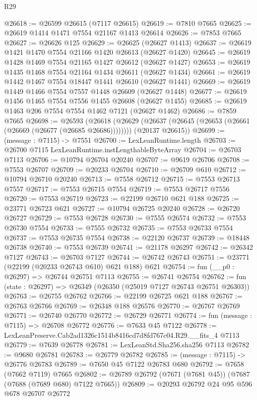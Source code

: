 \begin{lexlean}{R29}
\begin{coremodule}
@26618 := @26599 @26615 (@7117 @26615)
@26619 := @7810 @7665
@26625 := @26619 @1414 @1471 @7554 @21167 @1413 @26614
@26626 := @7853 @7665
@26627 := @26626 @125
@26629 := @26625 (@26627 @1413)
@26637 := @26619 @1421 @1470 @7554 @21166 @1420 @26613 (@26627 @1420)
@26645 := @26619 @1428 @1469 @7554 @21165 @1427 @26612 (@26627 @1427)
@26653 := @26619 @1435 @1468 @7554 @21164 @1434 @26611 (@26627 @1434)
@26661 := @26619 @1442 @1467 @7554 @18447 @1441 @26610 (@26627 @1441)
@26669 := @26619 @1449 @1466 @7554 @7557 @1448 @26609 (@26627 @1448)
@26677 := @26619 @1456 @1465 @7554 @7556 @1455 @26608 (@26627 @1455)
@26685 := @26619 @1463 @206 @7554 @7554 @1462 @7121 (@26627 @1462)
@26686 := @7859 @7665
@26698 := @26593
    (@26618
      (@26629 (@26637 (@26645 (@26653 (@26661 (@26669 (@26677 (@26685 @26686))))))))
      (@20137 @26615))
@26699 := (message : @7115) -> @7551
@26700 := LexLeanRuntime.length
@26703 := @26700 @7115 LexLeanRuntime.instLengthableByteArray
@26704 := @26703 @7113
@26706 := @10794 @26704 @20240
@26707 := @9619 @26706
@26708 := @7553 @26707
@26709 := @20233 @26704
@26710 := @26709 @610
@26712 := @10794 @26710 @20240
@26713 := @7558 @26712
@26715 := @7553 @26713 @7557
@26717 := @7553 @26715 @7554
@26719 := @7553 @26717 @7556
@26720 := @7553 @26719
@26723 := @22199 @26710 @621 @188
@26725 := @23771 @26723 @621
@26727 := @10794 @26725 @20240
@26728 := @26720 @26727
@26729 := @7553 @26728
@26730 := @7555 @26574
@26732 := @7553 @26730 @7554
@26733 := @7555 @26732
@26735 := @7553 @26733 @7554
@26737 := @7553 @26735 @7554
@26738 := @22120 @26737
@26739 := @18448 @26738
@26740 := @7553 @26739
@26741 := @21178 @26297
@26742 := @26342 @7127
@26743 := @26703 @7127
@26744 := @26742 @26743
@26751 := @23771 (@22199 (@20233 @26743 @610) @621 @188) @621
@26754 := fun (__p0 : @26297) => @26744 @26751 @7113
@26755 := @26741 @26754
@26762 := fun (state : @26297) => @26349 (@26350 (@25019 @7127 @26743 @26751 @26303))
@26763 := @26755 @26762
@26766 := @22199 @26725 @621 @188
@26767 := @26763 @26766
@26769 := @26348 @188 @26576
@26770 := @26767 @26769
@26771 := @26740 @26770
@26772 := @26729 @26771
@26774 := fun (message : @7115) => @26708 @26772
@26776 := @7633 @45 @7122
@26778 := LexLeanPreserve.Cab2ad1326c1514b8416cd7d8fd767c04.R29.__fits_4 @7113
@26779 := @7639 @26778
@26781 := LexLeanStd.Sha256.sha256 @7113
@26782 := @9680 @26781
@26783 := @26779 @26782
@26785 := (message : @7115) -> @26776 @26783
@26789 := @7650 @45 @7122 @26783 @680
@26792 := @7658 (@7662 @7119) @7665
@26802 := @26789 @26792 (@7671 (@7681 @45)) (@7687 (@7688 (@7689 @680) @7122 @7665))
@26809 := @20293 @26792 @24 @95 @596 @678 @26707 @26772

\end{coremodule}
\end{lexlean}
